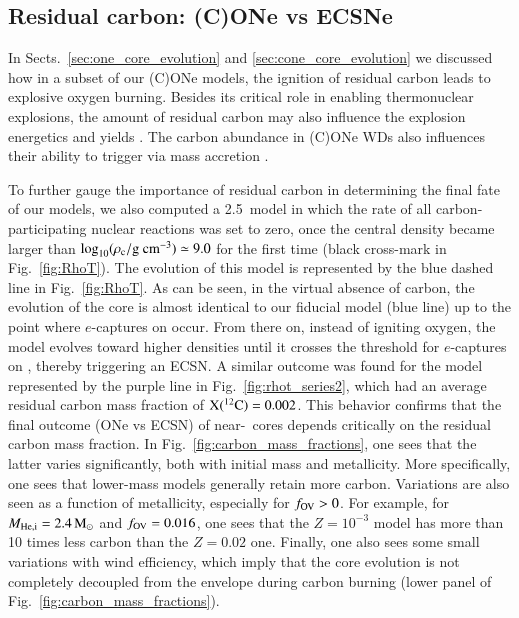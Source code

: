 \documentclass[main.tex]{subfiles}
\begin{document}
\subsection{Residual carbon: (C)ONe \ias vs ECSNe}\label{sec:carbon}
In Sects.~\ref{sec:one_core_evolution} and \ref{sec:cone_core_evolution} we discussed how in a subset of our (C)ONe models, 
the ignition of residual  carbon leads to explosive oxygen burning. Besides its critical role in enabling thermonuclear 
explosions, the amount of residual carbon may also influence the explosion energetics and  
yields \citep[see Sect.~\ref{sec:explosion_properties} and also][]{Willcox:2016yyp}. 
The carbon abundance in (C)ONe WDs also influences their ability to trigger \ias via mass accretion   
 \citep[e.g., see][]{Dominguez1993,  Garcia1997, Gutierrez2005, Waldman2007, Schwab:2018cnb}.
  

To further gauge the importance of residual carbon in determining the final fate of our models, 
we also computed a 2.5\msun\ model in which the rate of all 
carbon-participating nuclear reactions was set to zero, once the
central density became larger than $\rm \log_{10}(\rho_c / \rm g \ cm^{-3}) \simeq 9.0$ for
the first time (black cross-mark in Fig.~\ref{fig:RhoT}).  
The evolution of this model is represented by the blue dashed line in Fig.~\ref{fig:RhoT}. 
As can be seen, in the virtual absence of carbon, the evolution of 
the core is almost identical to our fiducial model (blue line) up to the point 
where $e$-captures on  occur. 
From there on, instead of igniting oxygen, the model evolves toward higher densities 
until it crosses the threshold for $e$-captures  
on , thereby triggering an ECSN. 
A similar outcome was found for the \seriestwo model represented by the purple line in 
Fig.~\ref{fig:rhot_series2}, which had an average residual carbon mass fraction of $\rm X(\iso{C}{12}) = 0.002$. 
This behavior confirms that the final outcome (ONe \ia vs ECSN) of near-\mch\ cores 
depends critically on the residual carbon mass fraction.   
In Fig.~\ref{fig:carbon_mass_fractions}, one sees that the latter varies significantly, 
both with initial mass and metallicity. 
More specifically, one sees that lower-mass models generally retain more carbon. 
Variations are also seen as a function of metallicity, especially for $f_{\rm OV}>0$. For example, for $M_{\rm He, i}=2.4\msun$ and $f_{\rm OV}=0.016$, one sees that the $Z=10^{-3}$ 
model has more than 10 times less carbon than 
the $Z=0.02$ one.  
Finally, one also sees some small variations with wind efficiency, which imply that the 
core evolution is not completely decoupled from the envelope during carbon burning 
(lower panel of Fig.~\ref{fig:carbon_mass_fractions}). 
\end{document}
